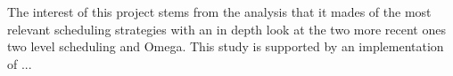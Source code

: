 \documentclass{svjour3}                     %
\begin{document}
The interest of this project stems from the analysis that it
mades of the most relevant scheduling strategies with an in depth look
at the two more recent ones two level scheduling and Omega. This study
is supported by an implementation of ... 










\end{document}
